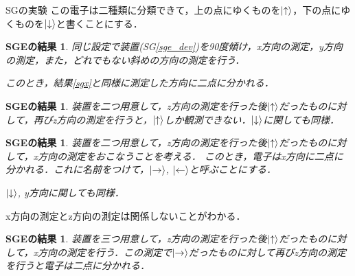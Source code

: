 \documentclass[dvipdfmx]{beamer}
\theoremstyle{break}
\newtheorem{result}[thm]{SGEの結果}
\newcommand{\up}{\ket{\uparrow}}
\newcommand{\down}{\ket{\downarrow}}
\begin{document}
\begin{frame}[allowframebreaks]{SGの実験}
		この電子は二種類に分類できて，上の点にゆくものを$\up$，下の点にゆくものを$\down$と書くことにする．


		\begin{result}
				同じ設定で装置(SG\ref{sge_dev})を90度傾け，x方向の測定，y方向の測定，また，どれでもない斜めの方向の測定を行う．
				
				このとき，結果\ref{sgx}と同様に測定した方向に二点に分かれる．
		\end{result}
		\begin{result}
				装置を二つ用意して，z方向の測定を行った後$\up$だったものに対して，再びz方向の測定を行うと，$\up$しか観測できない．$\down$に関しても同様．
		\end{result}
		\begin{result}
				装置を二つ用意して，z方向の測定を行った後$\up$だったものに対して，x方向の測定をおこなうことを考える．
				このとき，電子はx方向に二点に分かれる．これに名前をつけて，$\ket{\rightarrow}$, $\ket{\leftarrow}$と呼ぶことにする．

				$\down$, y方向に関しても同様．
		\end{result}
		x方向の測定とz方向の測定は関係しないことがわかる．

		\begin{result}
				装置を三つ用意して，z方向の測定を行った後$\up$だったものに対して，x方向の測定を行う．この測定で$\ket{\rightarrow}$だったものに対して再びz方向の測定を行うと電子は二点に分かれる．

		\end{result}
\end{frame}
\end{document}
